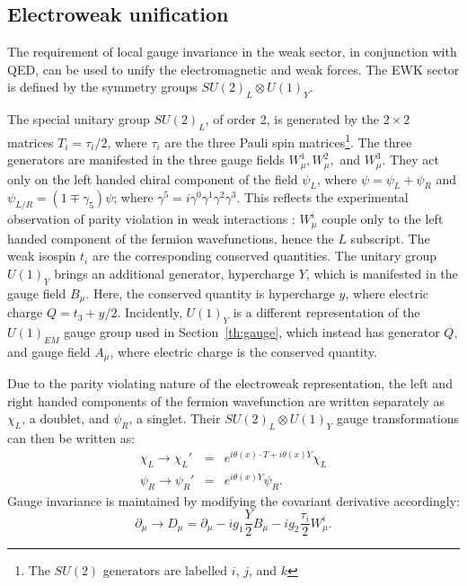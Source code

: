 \subsection{Electroweak unification \label{th:EW}}
%
The requirement of local gauge invariance in the weak sector, in conjunction with \ac{QED}, can be used to unify the electromagnetic and weak forces. 
The \ac{EWK} sector is defined by the symmetry groups $SU(2)_{L} \otimes U(1)_{Y}$.
%

The special unitary group $SU(2)_{L}$, of order 2, 
is generated by the $2\times2$ matrices $T_{i} = \tau_{i}/2$, 
where $\tau_{i}$ are the three Pauli spin matrices\footnote{The $SU(2)$ generators are labelled $i$, $j$, and $k$}.
The three generators are manifested in the three gauge fields 
$W^{1}_{\mu}, W^{2}_{\mu},$ and $W^{3}_{\mu}$. 
They act only on the left handed chiral component of the field $\psi_{L}$, 
where $\psi = \psi_{L} + \psi_{R}$ and $\psi_{L/R} = (1 \mp \gamma_{5})\psi$; 
where $\gamma^{5} = i\gamma^{0}\gamma^{1}\gamma^{2}\gamma^{3}$.
This reflects the experimental observation of parity violation in weak interactions%
: $W^{i}_{\mu}$ couple only to the left handed component of the fermion wavefunctions, hence the $L$ subscript. 
The weak isospin $t_{i}$ are the corresponding conserved quantities.
The unitary group $U(1)_{Y}$ brings an additional generator, hypercharge $Y$, which is manifested in the gauge field $B_{\mu}$. 
Here, the conserved quantity is hypercharge $y$, 
where electric charge $Q = t_{3} + y/2$.
Incidently, $U(1)_{Y}$ is a different representation of the $U(1)_{EM}$ gauge group used in Section~\ref{th:gauge}, 
which instead has generator $Q$, and gauge field $A_{\mu}$, where electric charge is the conserved quantity.




Due to the parity violating nature of the electroweak representation, the left and right handed components of the fermion wavefunction are written separately as $\chi_{L}$, a doublet, and $\psi_{R}$, a singlet. 
Their $SU(2)_{L} \otimes U(1)_{Y}$ gauge transformations can then be written as:
\begin{eqnarray}
\chi_{L} \rightarrow \chi_{L}' &=& e^{i \theta (x) \cdot T + i \theta (x) Y } \chi_{L} \\
\psi_{R} \rightarrow \psi_{R}' &=& e^{i \theta (x) Y } \psi_{R}.
\end{eqnarray}
Gauge invariance is maintained by modifying the covariant derivative accordingly:
\begin{equation}
\partial_{\mu} \rightarrow D_{\mu} = \partial_{\mu} - i g_{1} \frac{Y}{2} B_{\mu} - ig_{2} \frac{\tau_{i}}{2} W^{i}_{\mu}.
\label{eq:EWKcovariant}
\end{equation}


